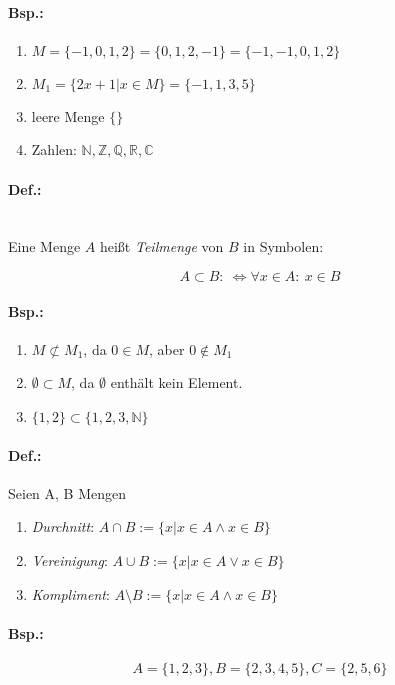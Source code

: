 \documentclass[11pt,a4paper,oneside]{article}
\begin{document}
{\paragraph{Bsp.:}
  \begin{enumerate}
    \item $M = \{-1, 0, 1, 2\} = \{0, 1, 2, -1\} = \{-1, -1, 0, 1, 2\}$ 
    \item $M_1 = \{2x + 1 | x \in M \} = \{-1, 1, 3, 5\}$
    \item leere Menge $\{\}$
    \item Zahlen: $\mathbb{N}, \mathbb{Z}, \mathbb{Q}, \mathbb{R}, \mathbb{C}$
  \end{enumerate}

\paragraph{Def.:}\mbox{}\\
  Eine Menge $A$ heißt \emph{Teilmenge} von $B$ in Symbolen:

  \[A \subset B:\:\Leftrightarrow \forall x \in A: \: x \in B \]

\paragraph{Bsp.:}
  \begin{enumerate}
    \item $M \not\subset M_1$, da $0 \in M$, aber $0 \notin M_1$
    \item $\emptyset \subset M$, da $\emptyset$ enthält kein Element.
    \item $\{1,2\} \subset \{1,2,3,\mathbb{N}\}$
  \end{enumerate}

\paragraph{Def.:} Seien A, B Mengen
  \begin{enumerate}
    \item \emph{Durchnitt}: $A \cap B:=\{x|x \in A \land x \in B\}$
    \item \emph{Vereinigung}: $A \cup B:=\{x|x \in A \lor x \in B\}$
    \item \emph{Kompliment}: $A \setminus B:=\{x|x \in A \land x \in B\}$
  \end{enumerate}

\paragraph{Bsp.:}
  \[A=\{1,2,3\}, B=\{2,3,4,5\}, C=\{2,5,6\}\]

}
\end{document}
